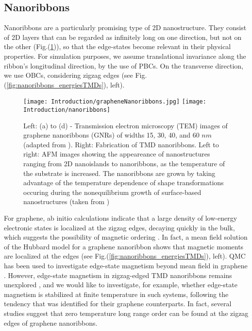\subsection{Nanoribbons}\label{subsec:nanoribbons}

Nanoribbons are a particularly promising type of \acs{2D} nanostructure.
They consist of \ac{2D} layers that can be regarded as infinitely long on one direction, but not on the other (Fig.(\ref{fig:graphNanoFabricationTMD})), so that the edge-states become relevant in their physical properties.
For simulation purposes, we assume translational invariance along the ribbon's longitudinal direction, by the use of \acp{PBC}.
On the transverse direction, we use \acp{OBC},  considering zigzag edges (see Fig.(\ref{fig:nanoribbons_energiesTMDs}), left).
\begin{figure}[H]
\texttt{[image: Introduction/grapheneNanoribbons.jpg]}
\texttt{[image: Introduction/nanoribbons]}
\caption[(TEM) images of graphene nanoribbons. Fabrication of \ac{TMD} nanoribbons.]{Left: (a) to (d) - Transmission electron microscopy (TEM) images of graphene nanoribbons (GNRs) of widths 15, 30, 40, and 60 $nm$ (adapted from \cite{mohanty_nanotomy-based_2012}). Right: Fabrication of \ac{TMD} nanoribbons. Left to right: \ac{AFM} images showing the appeareance of nanostructures ranging from \ac{2D} nanoislands to nanoribbons, as the temperature of the substrate is increased. The nanoribbons are grown by taking advantage of the temperature dependence of shape transformations occuring during the nonequilibrium growth of surface-based nanostructures (taken from \cite{chen_fabrication_2017})}
\label{fig:graphNanoFabricationTMD}
\end{figure}

For graphene, ab initio calculations indicate that a large density of low-energy electronic states is localized at the zigzag edges, decaying quickly in the bulk, which suggests the possibility of magnetic ordering \cite{yazyev_emergence_2010}.
In fact, a mean field solution of the Hubbard model for a graphene nanoribbon shows that magnetic moments are localized at the edges \cite{yazyev_emergence_2010} (see Fig.(\ref{fig:nanoribbons_energiesTMDs}), left).
QMC has been used to investigate edge-state magnetism beyond mean field in graphene \cite{feldner_dynamical_2011, golor_quantum_2013, cheng_strain-induced_2015, raczkowski_interplay_2017, yang_strain-tuning_2017}.
However, edge-state magnetism in zigzag-edged \ac{TMD} nanoribbons remains unexplored \cite{davelou_nanoribbon_2017}, and we would like to investigate, for example, whether edge-state magnetism is stabilized at finite temperature in such systems, following the tendency that was identified for their graphene counterparts.
In fact, several studies suggest that zero temperature long range order can be found at the zigzag edges of graphene nanoribbons.

